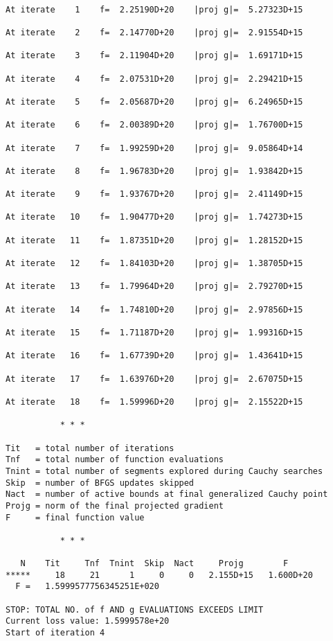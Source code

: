 \documentclass[11pt]{article}
\begin{document}
    \begin{Verbatim}[commandchars=\\\{\}]

At iterate    1    f=  2.25190D+20    |proj g|=  5.27323D+15

At iterate    2    f=  2.14770D+20    |proj g|=  2.91554D+15

At iterate    3    f=  2.11904D+20    |proj g|=  1.69171D+15

At iterate    4    f=  2.07531D+20    |proj g|=  2.29421D+15

At iterate    5    f=  2.05687D+20    |proj g|=  6.24965D+15

At iterate    6    f=  2.00389D+20    |proj g|=  1.76700D+15

At iterate    7    f=  1.99259D+20    |proj g|=  9.05864D+14

At iterate    8    f=  1.96783D+20    |proj g|=  1.93842D+15

At iterate    9    f=  1.93767D+20    |proj g|=  2.41149D+15

At iterate   10    f=  1.90477D+20    |proj g|=  1.74273D+15

At iterate   11    f=  1.87351D+20    |proj g|=  1.28152D+15

At iterate   12    f=  1.84103D+20    |proj g|=  1.38705D+15

At iterate   13    f=  1.79964D+20    |proj g|=  2.79270D+15

At iterate   14    f=  1.74810D+20    |proj g|=  2.97856D+15

At iterate   15    f=  1.71187D+20    |proj g|=  1.99316D+15

At iterate   16    f=  1.67739D+20    |proj g|=  1.43641D+15

At iterate   17    f=  1.63976D+20    |proj g|=  2.67075D+15

At iterate   18    f=  1.59996D+20    |proj g|=  2.15522D+15

           * * *

Tit   = total number of iterations
Tnf   = total number of function evaluations
Tnint = total number of segments explored during Cauchy searches
Skip  = number of BFGS updates skipped
Nact  = number of active bounds at final generalized Cauchy point
Projg = norm of the final projected gradient
F     = final function value

           * * *

   N    Tit     Tnf  Tnint  Skip  Nact     Projg        F
*****     18     21      1     0     0   2.155D+15   1.600D+20
  F =   1.5999577756345251E+020

STOP: TOTAL NO. of f AND g EVALUATIONS EXCEEDS LIMIT
Current loss value: 1.5999578e+20
Start of iteration 4
    \end{Verbatim}
\end{document}
